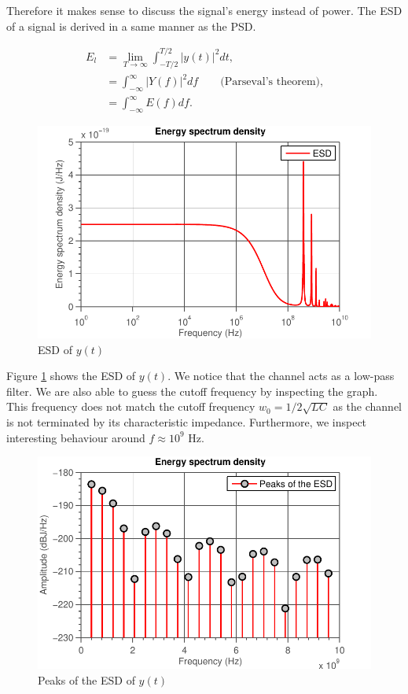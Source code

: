 \documentclass[11pt,titlepage]{report}
\begin{document}
Therefore it makes sense to discuss the signal's energy instead of power. The ESD of a signal is derived in a same manner as the PSD.

\begin{align}
	E_l &= \lim_{T \to \infty} \int_{-T/2}^{T/2} |y(t)|^2 dt, \label{eq:ass-1-psd-lim} \\
	&= \int_{-\infty}^{\infty} |Y(f)|^2 df \quad \quad \text{(Parseval's theorem),} \nonumber \\
	&= \int_{-\infty}^{\infty} E(f) df.
\end{align}

\begin{figure}[H]
	\centering
	\includegraphics[width=.85\linewidth]{resource/esd.pdf}
	\caption{ESD of $y(t)$}
	\label{fig:ass-1-esd}
\end{figure}

Figure \ref{fig:ass-1-esd} shows the ESD of $y(t)$. We notice that the channel acts as a low-pass filter. We are also able to guess the cutoff frequency by inspecting the graph. This frequency does not match the cutoff frequency $w_0=1/2\sqrt{LC}$ as the channel is not terminated by its characteristic impedance. Furthermore, we inspect interesting behaviour around $f\approx 10^9 \text{ Hz}$.

\begin{figure}[H]
	\centering
	\includegraphics[width=.85\linewidth]{resource/peaks.pdf}
	\caption{Peaks of the ESD of $y(t)$}
	\label{fig:ass-1-peaks}
\end{figure}
\end{document}
